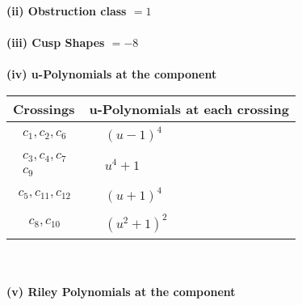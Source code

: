 \documentclass[1p]{elsarticle_modified}
\theoremstyle{definition}
\begin{document}
\flushleft \textbf{(ii) Obstruction class $= 1$}\\~\\
\flushleft \textbf{(iii) Cusp Shapes $= -8$}\\~\\
\newpage\renewcommand{\arraystretch}{1}
\flushleft \textbf{(iv) u-Polynomials at the component}\newline \\
\begin{tabular}{m{50pt}|m{274pt}}
Crossings & \hspace{64pt}u-Polynomials at each crossing \\
\hline $$\begin{aligned}c_{1},c_{2},c_{6}\end{aligned}$$&$\begin{aligned}
&(u-1)^4
\end{aligned}$\\
\hline $$\begin{aligned}c_{3},c_{4},c_{7}\\c_{9}\end{aligned}$$&$\begin{aligned}
&u^4+1
\end{aligned}$\\
\hline $$\begin{aligned}c_{5},c_{11},c_{12}\end{aligned}$$&$\begin{aligned}
&(u+1)^4
\end{aligned}$\\
\hline $$\begin{aligned}c_{8},c_{10}\end{aligned}$$&$\begin{aligned}
&(u^2+1)^2
\end{aligned}$\\
\hline
\end{tabular}\\~\\
\newpage\renewcommand{\arraystretch}{1}
\flushleft \textbf{(v) Riley Polynomials at the component}\newline \\
\end{document}
